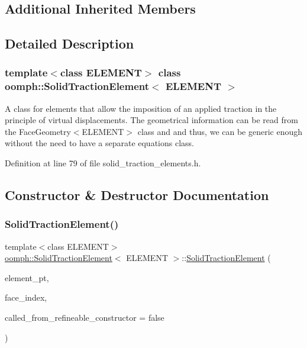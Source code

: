 \subsection*{Additional Inherited Members}


\subsection{Detailed Description}
\subsubsection*{template$<$class E\+L\+E\+M\+E\+NT$>$\newline
class oomph\+::\+Solid\+Traction\+Element$<$ E\+L\+E\+M\+E\+N\+T $>$}

A class for elements that allow the imposition of an applied traction in the principle of virtual displacements. The geometrical information can be read from the Face\+Geometry$<$\+E\+L\+E\+M\+E\+N\+T$>$ class and and thus, we can be generic enough without the need to have a separate equations class. 

Definition at line 79 of file solid\+\_\+traction\+\_\+elements.\+h.



\subsection{Constructor \& Destructor Documentation}
\mbox{\label{classoomph_1_1SolidTractionElement_a76c88d0b8ce62fadb73b0b3da315fa05}} 
\subsubsection{\texorpdfstring{Solid\+Traction\+Element()}{SolidTractionElement()}}
{\footnotesize\ttfamily template$<$class E\+L\+E\+M\+E\+NT$>$ \\
\hyperlink{classoomph_1_1SolidTractionElement}{oomph\+::\+Solid\+Traction\+Element}$<$ E\+L\+E\+M\+E\+NT $>$\+::\hyperlink{classoomph_1_1SolidTractionElement}{Solid\+Traction\+Element} (\begin{DoxyParamCaption}\item[{\hyperlink{classoomph_1_1FiniteElement}{Finite\+Element} $\ast$const \&}]{element\+\_\+pt,  }\item[{const int \&}]{face\+\_\+index,  }\item[{const bool \&}]{called\+\_\+from\+\_\+refineable\+\_\+constructor = {\ttfamily false} }\end{DoxyParamCaption})\hspace{0.3cm}{\ttfamily [inline]}}




